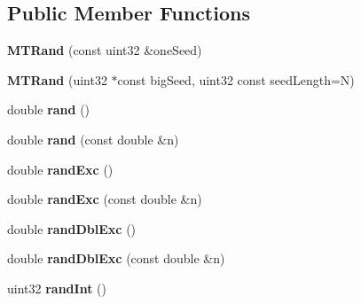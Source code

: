 \subsection*{Public Member Functions}
\begin{DoxyCompactItemize}
\item 
\hypertarget{classelpm_1_1_m_t_rand_a9ec78966278af6ff4ba62680df11ba75}{{\bfseries M\+T\+Rand} (const uint32 \&one\+Seed)}\label{classelpm_1_1_m_t_rand_a9ec78966278af6ff4ba62680df11ba75}

\item 
\hypertarget{classelpm_1_1_m_t_rand_a113970f6e61dfa66b11bd483cca66766}{{\bfseries M\+T\+Rand} (uint32 $\ast$const big\+Seed, uint32 const seed\+Length=N)}\label{classelpm_1_1_m_t_rand_a113970f6e61dfa66b11bd483cca66766}

\item 
\hypertarget{classelpm_1_1_m_t_rand_a6adfe1521b383ea90925e59ac6e0bfa7}{double {\bfseries rand} ()}\label{classelpm_1_1_m_t_rand_a6adfe1521b383ea90925e59ac6e0bfa7}

\item 
\hypertarget{classelpm_1_1_m_t_rand_a20f691553603527a420441f7c54d50f7}{double {\bfseries rand} (const double \&n)}\label{classelpm_1_1_m_t_rand_a20f691553603527a420441f7c54d50f7}

\item 
\hypertarget{classelpm_1_1_m_t_rand_aa5e63c3e5f92961472aff30aefa478a3}{double {\bfseries rand\+Exc} ()}\label{classelpm_1_1_m_t_rand_aa5e63c3e5f92961472aff30aefa478a3}

\item 
\hypertarget{classelpm_1_1_m_t_rand_a71dd64de42981ab908d13a88df1bd7ac}{double {\bfseries rand\+Exc} (const double \&n)}\label{classelpm_1_1_m_t_rand_a71dd64de42981ab908d13a88df1bd7ac}

\item 
\hypertarget{classelpm_1_1_m_t_rand_ac085bdbd007f4735d988f4a713ee19b3}{double {\bfseries rand\+Dbl\+Exc} ()}\label{classelpm_1_1_m_t_rand_ac085bdbd007f4735d988f4a713ee19b3}

\item 
\hypertarget{classelpm_1_1_m_t_rand_a4c9abac79993c0514248c86823b6627e}{double {\bfseries rand\+Dbl\+Exc} (const double \&n)}\label{classelpm_1_1_m_t_rand_a4c9abac79993c0514248c86823b6627e}

\item 
\hypertarget{classelpm_1_1_m_t_rand_a7d7a55226e3c6154b25280cd258d3a6d}{uint32 {\bfseries rand\+Int} ()}\label{classelpm_1_1_m_t_rand_a7d7a55226e3c6154b25280cd258d3a6d}


\end{DoxyCompactItemize}
